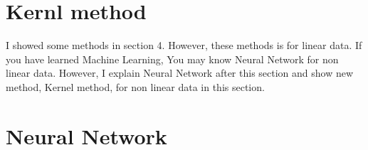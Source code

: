 \documentclass[11pt, a4paper, english, dvipdfmx]{jsarticle}
\theoremstyle{definition}
\begin{document}
\section{Kernl method}
I showed some methods in section 4. However, these methods is for linear data. 
If you have learned Machine Learning, You may know Neural Network for non linear data.
However, I explain Neural Network after this section and show new method, Kernel method, for non linear data in this section. 

\section{Neural Network}
\end{document}
